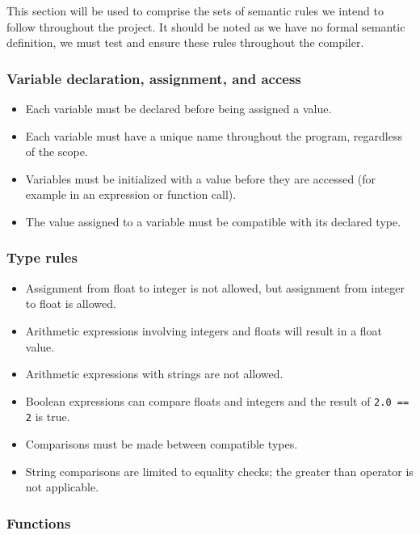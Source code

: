 This section will be used to comprise the sets of semantic rules we intend to follow throughout the project.
It should be noted as we have no formal semantic definition, we must test and ensure these rules throughout the
compiler.

\subsubsection{Variable declaration, assignment, and access}

\begin{itemize}
    \item Each variable must be declared before being assigned a value.
    \item Each variable must have a unique name throughout the program, regardless of the scope.
    \item Variables must be initialized with a value before they are accessed (for example in an expression or function call).
    \item The value assigned to a variable must be compatible with its declared type.
\end{itemize}

\subsubsection{Type rules}

\begin{itemize}
    \item Assignment from float to integer is not allowed, but assignment from integer to float is allowed.
    \item Arithmetic expressions involving integers and floats will result in a float value.
    \item Arithmetic expressions with strings are not allowed.
    \item Boolean expressions can compare floats and integers and the result of \texttt{2.0 == 2} is true.
    \item Comparisons must be made between compatible types.
    \item String comparisons are limited to equality checks; the greater than operator is not applicable.
    \end{itemize}

\subsubsection{Functions}

